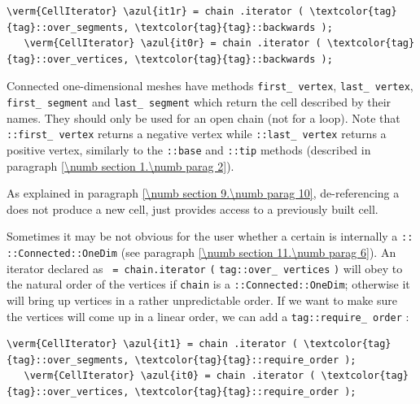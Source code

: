 \begin{Verbatim}[commandchars=\\\{\},formatcom=\small\tt,
   baselinestretch=0.94,framesep=2mm                      ]
   \verm{CellIterator} \azul{it1r} = chain .iterator ( \textcolor{tag}{tag}::over_segments, \textcolor{tag}{tag}::backwards );
   \verm{CellIterator} \azul{it0r} = chain .iterator ( \textcolor{tag}{tag}::over_vertices, \textcolor{tag}{tag}::backwards );
\end{Verbatim}

Connected one-dimensional meshes have methods {\small\tt first\_\,vertex},
{\small\tt last\_\,vertex}, {\small\tt first\_\,segment} and {\small\tt last\_\,segment}
which return the cell described by their names.
They should only be used for an open chain (not for a loop).
Note that {\small\tt {}::first\_\,vertex} returns a negative vertex while
{\small\tt {}::last\_\,vertex} returns a positive vertex, similarly to the
{\small\tt {}::base} and {\small\tt {}::tip} methods (described in paragraph
\ref{\numb section 1.\numb parag 2}).

As explained in paragraph \ref{\numb section 9.\numb parag 10},
de-referencing a {\small\tt {}} does not produce a new cell,
just provides access to a previously built cell.

Sometimes it may be not obvious for the user whether a certain {\small\tt {}}
is internally a {\small\tt {}:: ::Connected::OneDim}
(see paragraph \ref{\numb section 11.\numb parag 6}).
An iterator declared as {\small\tt {} = chain.iterator}\break
{\small\tt(} {\small\tt\textcolor{tag}{tag}::over\_\,vertices} {\small\tt)} will obey to
the natural order of the vertices if {\small\tt chain} is a\break
{\small\tt {}::Connected::OneDim}; otherwise it will bring up vertices
in a rather unpredictable order.
If we want to make sure the vertices will come up in a linear order, we can add a
{\small\tt \textcolor{tag}{tag}::require\_\,order} :

\begin{Verbatim}[commandchars=\\\{\},formatcom=\small\tt,
   baselinestretch=0.94,framesep=2mm                      ]
   \verm{CellIterator} \azul{it1} = chain .iterator ( \textcolor{tag}{tag}::over_segments, \textcolor{tag}{tag}::require_order );
   \verm{CellIterator} \azul{it0} = chain .iterator ( \textcolor{tag}{tag}::over_vertices, \textcolor{tag}{tag}::require_order );
\end{Verbatim}

